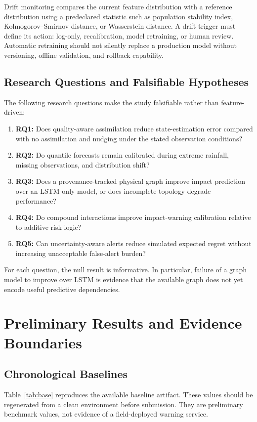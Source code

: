 \documentclass[journal]{IEEEtran}
\begin{document}
Drift monitoring compares the current feature distribution with a reference distribution using a predeclared statistic such as population stability index, Kolmogorov--Smirnov distance, or Wasserstein distance. A drift trigger must define its action: log-only, recalibration, model retraining, or human review. Automatic retraining should not silently replace a production model without versioning, offline validation, and rollback capability.

\subsection{Research Questions and Falsifiable Hypotheses}
The following research questions make the study falsifiable rather than feature-driven:
\begin{enumerate}
\item \textbf{RQ1:} Does quality-aware assimilation reduce state-estimation error compared with no assimilation and nudging under the stated observation conditions?
\item \textbf{RQ2:} Do quantile forecasts remain calibrated during extreme rainfall, missing observations, and distribution shift?
\item \textbf{RQ3:} Does a provenance-tracked physical graph improve impact prediction over an LSTM-only model, or does incomplete topology degrade performance?
\item \textbf{RQ4:} Do compound interactions improve impact-warning calibration relative to additive risk logic?
\item \textbf{RQ5:} Can uncertainty-aware alerts reduce simulated expected regret without increasing unacceptable false-alert burden?
\end{enumerate}
For each question, the null result is informative. In particular, failure of a graph model to improve over LSTM is evidence that the available graph does not yet encode useful predictive dependencies.

\section{Preliminary Results and Evidence Boundaries}
\subsection{Chronological Baselines}
Table~\ref{tab:base} reproduces the available baseline artifact. These values should be regenerated from a clean environment before submission. They are preliminary benchmark values, not evidence of a field-deployed warning service.
\end{document}
